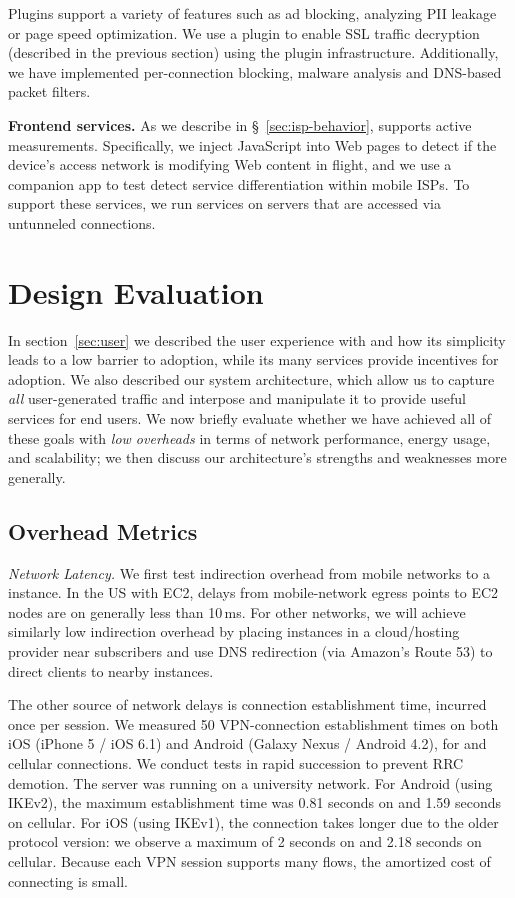 Plugins support a variety of features such as ad blocking, 
analyzing PII leakage or page speed optimization. We 
 use a plugin to enable SSL traffic decryption (described in the previous section) using 
the \platname{} plugin infrastructure. Additionally, we have implemented 
per-connection blocking, malware analysis and DNS-based packet filters. 

\noindent\textbf{Frontend services.} As we describe in \S~\ref{sec:isp-behavior}, 
\meddle supports active measurements. 
Specifically, we inject JavaScript into Web pages to detect if the device's 
access network is modifying Web content in flight, and we use a companion app to 
test detect service differentiation within mobile ISPs. To support these services, we 
run services on \meddle servers that are accessed via untunneled connections. 

\section{Design Evaluation}
\label{subsec:design_deploy}

In section~\ref{sec:user} we described the user experience with \meddle and how its simplicity leads to a low barrier to adoption, while its many services provide incentives for adoption. We also described our system architecture, which allow us to capture {\it all} user-generated traffic and interpose and manipulate it to provide useful services for end users. We now briefly evaluate whether we have achieved all of these goals with {\it low overheads} in terms of network performance, energy usage, and scalability; we then discuss our architecture's strengths and weaknesses more generally. 

\subsection{Overhead Metrics}
\noindent\emph{Network Latency.}
We first test indirection overhead from mobile networks to a \meddle instance. In the 
US with EC2, delays from mobile-network egress points to EC2 nodes are on generally less than 10\,ms. 
For other networks, we will achieve similarly low indirection overhead by placing instances in a cloud/hosting 
provider near subscribers and use DNS redirection (\eg via Amazon's Route 53) to direct clients to nearby instances. 

The other source of network delays is connection establishment time, incurred once per session. We measured 
50 VPN-connection establishment times on both iOS (iPhone 5 / iOS 6.1) and Android (Galaxy Nexus /
Android 4.2), for \wifi{} and cellular connections. We conduct tests in rapid succession to prevent RRC demotion.
The \meddle server was running on a university network. 
For Android (using IKEv2), the maximum establishment time was 0.81 seconds on \wifi{} and 1.59 seconds on cellular. 
For iOS (using IKEv1), the connection takes longer due to the older protocol version: we observe a maximum of 2 seconds on \wifi{} and 2.18 seconds on cellular. 
Because each VPN session supports many flows, the amortized cost of connecting is  small. 

